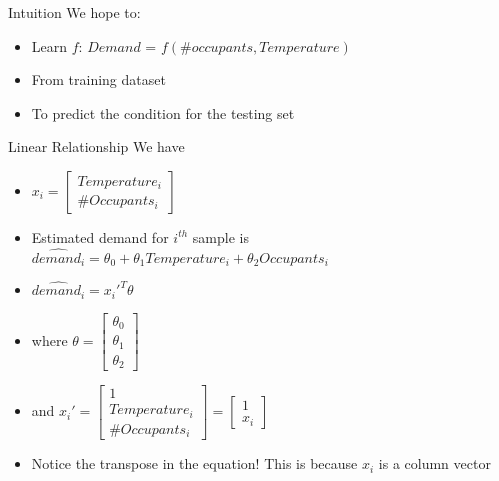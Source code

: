 \documentclass{beamer}
\begin{document}
\begin{frame}{Intuition}
    We hope to: 
    \begin{itemize}
        \item Learn $f$: $Demand$ = $f(\# occupants, Temperature)$
        \item From training dataset
        \item To predict the condition for the testing set
    \end{itemize}
\end{frame}


\begin{frame}{Linear Relationship}
    We have 
    \begin{itemize}[<+->]
    	\item $x_i = \begin{bmatrix}
    	Temperature_i\\\#Occupants_i
    	\end{bmatrix}$
        \item Estimated demand for $i^{th}$ sample is  $\hat{demand_{i}} = \theta_{0} + \theta_{1} Temperature_i + \theta_{2} Occupants_i$
        \item $\hat{demand_{i}} = x_{i}'^{T} \theta$
        \item where $\theta = \begin{bmatrix}\theta_0\\\theta_1\\ \theta_2
        \end{bmatrix}$
        \item and $x_{i}' = \begin{bmatrix}
        1\\Temperature_i\\\#Occupants_i
        \end{bmatrix} = \begin{bmatrix}
        1 \\ x_i
        \end{bmatrix}$
        \item Notice the transpose in the equation! This is because $x_{i}$ is a column vector
    \end{itemize}

\end{frame}
\end{document}
